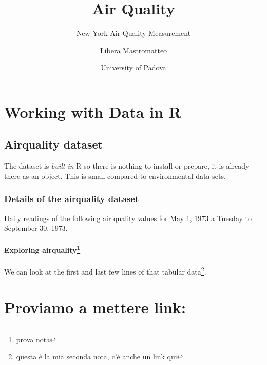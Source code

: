 \documentclass[
]{article}
\title{Air Quality}
\subtitle{New York Air Quality Measurement}
\author{Libera Mastromatteo}
\date{University of Padova}
\begin{document}
\maketitle

{
\setcounter{tocdepth}{4}
\tableofcontents
}
\newpage

\hypertarget{working-with-data-in-r}{%
\section{Working with Data in R}\label{working-with-data-in-r}}

\hypertarget{airquality-dataset}{%
\subsection{Airquality dataset}\label{airquality-dataset}}

The \color{red}{airquality} \normalcolor dataset is \emph{built-in} R so there is nothing to install or prepare, it is already there as an \color{green}{R} \normalcolor object. This \color{red}{data} \normalcolor  is small compared to environmental data sets.

\hypertarget{details-of-the-airquality-dataset}{%
\subsubsection{Details of the airquality dataset}\label{details-of-the-airquality-dataset}}

Daily readings of the following air quality values for May 1, 1973 a Tuesday to September 30, 1973.

\hypertarget{exploring-airquality1}{%
\paragraph[Exploring airquality]{\texorpdfstring{Exploring airquality\footnote{prova nota}}{Exploring airquality}}\label{exploring-airquality1}}

We can look at the first and last few lines of that \color{blue}{airquality} \normalcolor tabular data\footnote{questa è la mia seconda nota, c'è anche un link \color{blue}\href{https://stat.ethz.ch/R-manual/R-devel/library/datasets/html/airquality.html}{qui}\normalcolor}.

\hypertarget{proviamo-a-mettere-link}{%
\section{Proviamo a mettere link:}\label{proviamo-a-mettere-link}}
\end{document}
